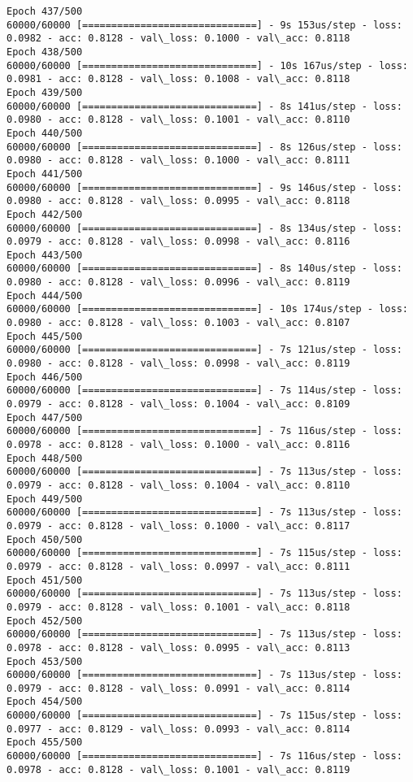 \documentclass[11pt]{article}
\begin{document}
\begin{Verbatim}[commandchars=\\\{\}]
Epoch 437/500
60000/60000 [==============================] - 9s 153us/step - loss: 0.0982 - acc: 0.8128 - val\_loss: 0.1000 - val\_acc: 0.8118
Epoch 438/500
60000/60000 [==============================] - 10s 167us/step - loss: 0.0981 - acc: 0.8128 - val\_loss: 0.1008 - val\_acc: 0.8118
Epoch 439/500
60000/60000 [==============================] - 8s 141us/step - loss: 0.0980 - acc: 0.8128 - val\_loss: 0.1001 - val\_acc: 0.8110
Epoch 440/500
60000/60000 [==============================] - 8s 126us/step - loss: 0.0980 - acc: 0.8128 - val\_loss: 0.1000 - val\_acc: 0.8111
Epoch 441/500
60000/60000 [==============================] - 9s 146us/step - loss: 0.0980 - acc: 0.8128 - val\_loss: 0.0995 - val\_acc: 0.8118
Epoch 442/500
60000/60000 [==============================] - 8s 134us/step - loss: 0.0979 - acc: 0.8128 - val\_loss: 0.0998 - val\_acc: 0.8116
Epoch 443/500
60000/60000 [==============================] - 8s 140us/step - loss: 0.0980 - acc: 0.8128 - val\_loss: 0.0996 - val\_acc: 0.8119
Epoch 444/500
60000/60000 [==============================] - 10s 174us/step - loss: 0.0980 - acc: 0.8128 - val\_loss: 0.1003 - val\_acc: 0.8107
Epoch 445/500
60000/60000 [==============================] - 7s 121us/step - loss: 0.0980 - acc: 0.8128 - val\_loss: 0.0998 - val\_acc: 0.8119
Epoch 446/500
60000/60000 [==============================] - 7s 114us/step - loss: 0.0979 - acc: 0.8128 - val\_loss: 0.1004 - val\_acc: 0.8109
Epoch 447/500
60000/60000 [==============================] - 7s 116us/step - loss: 0.0978 - acc: 0.8128 - val\_loss: 0.1000 - val\_acc: 0.8116
Epoch 448/500
60000/60000 [==============================] - 7s 113us/step - loss: 0.0979 - acc: 0.8128 - val\_loss: 0.1004 - val\_acc: 0.8110
Epoch 449/500
60000/60000 [==============================] - 7s 113us/step - loss: 0.0979 - acc: 0.8128 - val\_loss: 0.1000 - val\_acc: 0.8117
Epoch 450/500
60000/60000 [==============================] - 7s 115us/step - loss: 0.0979 - acc: 0.8128 - val\_loss: 0.0997 - val\_acc: 0.8111
Epoch 451/500
60000/60000 [==============================] - 7s 113us/step - loss: 0.0979 - acc: 0.8128 - val\_loss: 0.1001 - val\_acc: 0.8118
Epoch 452/500
60000/60000 [==============================] - 7s 113us/step - loss: 0.0978 - acc: 0.8128 - val\_loss: 0.0995 - val\_acc: 0.8113
Epoch 453/500
60000/60000 [==============================] - 7s 113us/step - loss: 0.0979 - acc: 0.8128 - val\_loss: 0.0991 - val\_acc: 0.8114
Epoch 454/500
60000/60000 [==============================] - 7s 115us/step - loss: 0.0977 - acc: 0.8129 - val\_loss: 0.0993 - val\_acc: 0.8114
Epoch 455/500
60000/60000 [==============================] - 7s 116us/step - loss: 0.0978 - acc: 0.8128 - val\_loss: 0.1001 - val\_acc: 0.8119

\end{Verbatim}
\end{document}
